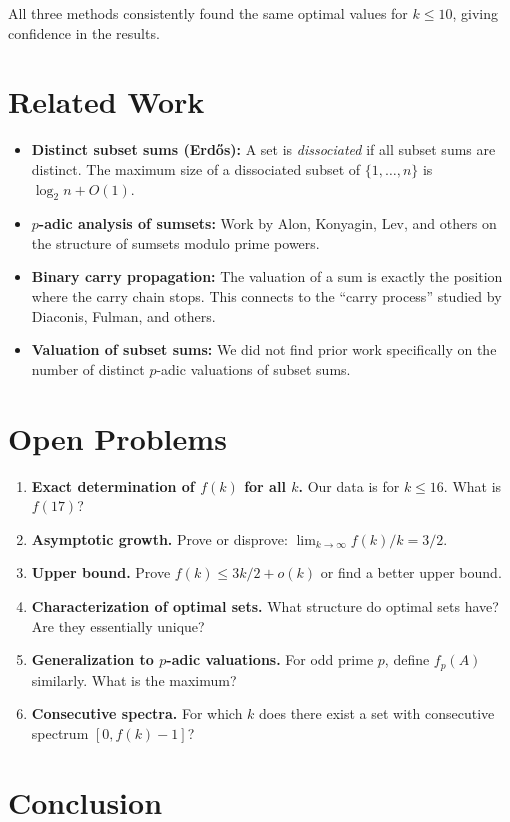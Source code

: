 \documentclass[11pt]{article}
\begin{document}
All three methods consistently found the same optimal values for $k \le 10$, giving confidence in the results.

\section{Related Work}

\begin{itemize}
\item \textbf{Distinct subset sums (Erdős):} A set is \emph{dissociated} if all subset sums are distinct. The maximum size of a dissociated subset of $\{1,\dots,n\}$ is $\log_2 n + O(1)$.
\item \textbf{$p$-adic analysis of sumsets:} Work by Alon, Konyagin, Lev, and others on the structure of sumsets modulo prime powers.
\item \textbf{Binary carry propagation:} The valuation of a sum is exactly the position where the carry chain stops. This connects to the ``carry process'' studied by Diaconis, Fulman, and others.
\item \textbf{Valuation of subset sums:} We did not find prior work specifically on the number of distinct $p$-adic valuations of subset sums.
\end{itemize}

\section{Open Problems}

\begin{enumerate}
\item \textbf{Exact determination of $f(k)$ for all $k$.} Our data is for $k \le 16$. What is $f(17)$?
\item \textbf{Asymptotic growth.} Prove or disprove: $\lim_{k \to \infty} f(k)/k = 3/2$.
\item \textbf{Upper bound.} Prove $f(k) \le 3k/2 + o(k)$ or find a better upper bound.
\item \textbf{Characterization of optimal sets.} What structure do optimal sets have? Are they essentially unique?
\item \textbf{Generalization to $p$-adic valuations.} For odd prime $p$, define $f_p(A)$ similarly. What is the maximum?
\item \textbf{Consecutive spectra.} For which $k$ does there exist a set with consecutive spectrum $[0, f(k)-1]$?
\end{enumerate}

\section{Conclusion}
\end{document}
